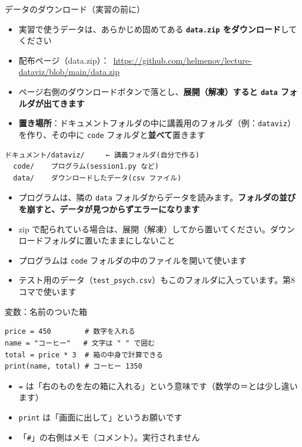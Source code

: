 \documentclass[aspectratio=169,11pt]{beamer}
\begin{document}
\begin{frame}[fragile]{データのダウンロード（実習の前に）}
\begin{itemize}
\item 実習で使うデータは、あらかじめ固めてある \textbf{\texttt{data.zip} をダウンロード}してください
\item 配布ページ（data.zip）：\ \url{https://github.com/helmenov/lecture-dataviz/blob/main/data.zip}
\item ページ右側のダウンロードボタンで落とし、\textbf{展開（解凍）すると \texttt{data} フォルダが出てきます}
\item \textbf{置き場所}：ドキュメントフォルダの中に講義用のフォルダ（例：\texttt{dataviz}）を作り、その中に \texttt{code} フォルダと\textbf{並べて}置きます
\end{itemize}
\begin{lstlisting}
ドキュメント/dataviz/     ← 講義フォルダ(自分で作る)
  code/    プログラム(session1.py など)
  data/    ダウンロードしたデータ(csv ファイル)
\end{lstlisting}
\begin{itemize}
\item プログラムは、隣の \texttt{data} フォルダからデータを読みます。\textbf{フォルダの並びを崩すと、データが見つからずエラーになります}
\item zip で配られている場合は、展開（解凍）してから置いてください。ダウンロードフォルダに置いたままにしないこと
\item プログラムは \texttt{code} フォルダの中のファイルを開いて使います
\item テスト用のデータ（\texttt{test\_psych.csv}）もこのフォルダに入っています。第8コマで使います
\end{itemize}
\end{frame}

\begin{frame}[fragile]{変数：名前のついた箱}
\begin{lstlisting}
price = 450        # 数字を入れる
name = "コーヒー"   # 文字は " " で囲む
total = price * 3  # 箱の中身で計算できる
print(name, total) # コーヒー 1350
\end{lstlisting}
\begin{itemize}
\item \texttt{=} は「右のものを左の箱に入れる」という意味です（数学の＝とは少し違います）
\item \texttt{print} は「画面に出して」というお願いです
\item 「\texttt{\#}」の右側はメモ（コメント）。実行されません
\end{itemize}
\end{frame}
\end{document}
